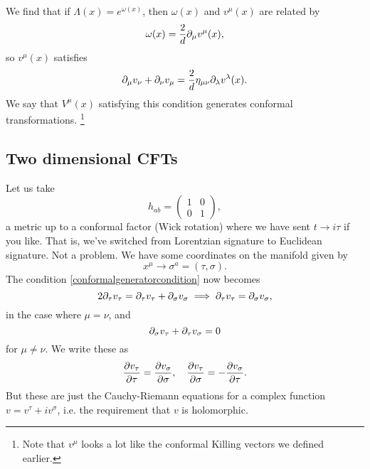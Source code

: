 We find that if $\Lambda(x)=e^{\omega(x)}$, then $\omega(x)$ and $v^\mu(x)$ are related by
\begin{equation}
    \omega(x)=\frac{2}{d} \p_\mu v^\mu (x),
\end{equation}
so $v^\mu(x)$ satisfies
\begin{equation}\label{conformalgeneratorcondition}
    \p_\mu v_\nu + \p_\nu v_\mu =\frac{2}{d} \eta_{\mu\nu} \p_\lambda v^\lambda(x).
\end{equation}
We say that $V^\mu(x)$ satisfying this condition generates conformal transformations.%
    \footnote{Note that $v^\mu$ looks a lot like the conformal Killing vectors we defined earlier.}

\subsection*{Two dimensional CFTs} Let us take
\begin{equation*}
    h_{ab}=\begin{pmatrix}1&0\\0&1\end{pmatrix},
\end{equation*}
a metric up to a conformal factor (Wick rotation) where we have sent $t\to i\tau$ if you like. That is, we've switched from Lorentzian signature to Euclidean signature. Not a problem. We have some coordinates on the manifold given by
\begin{equation}
    x^\mu \to \sigma^a=(\tau,\sigma).
\end{equation}
The condition \ref{conformalgeneratorcondition} now becomes
\begin{equation}
    2\p_\tau v_\tau = \p_\tau v_\tau +\p_\sigma v_\sigma \implies \p_\tau v_\tau = \p_\sigma v_\sigma,
\end{equation}
in the case where $\mu=\nu$, and 
\begin{equation}
    \p_\sigma v_\tau +\p_\tau v_\sigma =0
\end{equation}
for $\mu\neq \nu$. We write these as
\begin{equation}
    \P{v_\tau}{\tau}=\P{v_\sigma}{\sigma},\quad \P{v_\tau}{\sigma}=-\P{v_\sigma}{\tau}.
\end{equation}
But these are just the Cauchy-Riemann equations for a complex function $v=v^\tau+iv^\sigma$, i.e. the requirement that $v$ is holomorphic.

